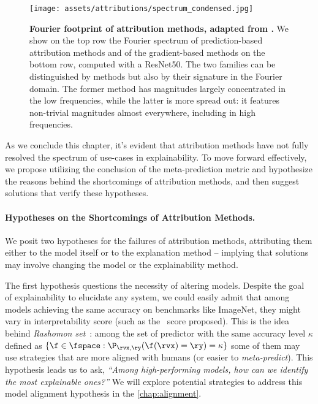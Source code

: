 \begin{figure}[ht]
    \centering
    \texttt{[image: assets/attributions/spectrum\_condensed.jpg]}
    \caption{\textbf{Fourier footprint of attribution methods, adapted from \cite{muzellec2023gradient}.} We show on the top row the Fourier spectrum of prediction-based attribution methods and of the gradient-based methods on the bottom row, computed with a ResNet50. The two families can be distinguished by methods but also by their signature in the Fourier domain. The former method has magnitudes largely concentrated in the low frequencies, while the latter is more spread out: it features non-trivial magnitudes almost everywhere, including in high frequencies.}
    \label{fig:attribution:spectrum}
\end{figure}

As we conclude this chapter, it's evident that attribution methods have not fully resolved the spectrum of use-cases in explainability. To move forward effectively, we propose utilizing the conclusion of the meta-prediction metric and hypothesize the reasons behind the shortcomings of attribution methods, and then suggest solutions that verify these hypotheses.


\paragraph{Hypotheses on the Shortcomings of Attribution Methods.} We posit two hypotheses for the failures of attribution methods, attributing them either to the model itself or to the explanation method -- implying that solutions may involve changing the model or the explainability method.

The first hypothesis questions the necessity of altering models. Despite the goal of explainability to elucidate any system, we could easily admit that among models achieving the same accuracy on benchmarks like ImageNet, they might vary in interpretability score (such as the \metric~score proposed). This is the idea behind \textit{Rashomon set}~\cite{xin2022exploring}: among the set of predictor with the same accuracy level $\kappa$ defined as $\{ \f \in \fspace : \P_{\rvx, \ry}(\f(\rvx) = \ry) = \kappa \}$ some of them may use strategies that are more aligned with humans (or easier to \textit{meta-predict}). This hypothesis leads us to ask, \textit{``Among high-performing models, how can we identify the most explainable ones?''} We will explore potential strategies to address this model alignment hypothesis in the \autoref{chap:alignment}.


